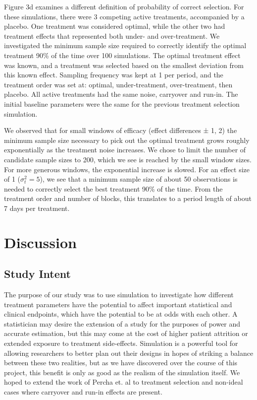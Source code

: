 \documentclass[11pt,]{article}
\begin{document}
Figure 3d examines a different definition of probability of correct
selection. For these simulations, there were 3 competing active
treatments, accompanied by a placebo. One treatment was considered
optimal, while the other two had treatment effects that represented both
under- and over-treatment. We investigated the minimum sample size
required to correctly identify the optimal treatment 90\% of the time
over 100 simulations. The optimal treatment effect was known, and a
treatment was selected based on the smallest deviation from this known
effect. Sampling frequency was kept at 1 per period, and the treatment
order was set at: optimal, under-treatment, over-treatment, then
placebo. All active treatments had the same noise, carryover and run-in.
The initial baseline parameters were the same for the previous treatment
selection simulation.

We observed that for small windows of efficacy (effect differences ± 1,
2) the minimum sample size necessary to pick out the optimal treatment
grows roughly exponentially as the treatment noise increases. We chose
to limit the number of candidate sample sizes to 200, which we see is
reached by the small window sizes. For more generous windows, the
exponential increase is slowed. For an effect size of 1
(\(\sigma_t^2 = 5\)), we see that a minimum sample size of about 50
observations is needed to correctly select the best treatment 90\% of
the time. From the treatment order and number of blocks, this translates
to a period length of about 7 days per treatment.

\section{Discussion}\label{discussion}

\subsection{Study Intent}\label{study-intent}

The purpose of our study was to use simulation to investigate how
different treatment parameters have the potential to affect important
statistical and clinical endpoints, which have the potential to be at
odds with each other. A statistician may desire the extension of a study
for the purposes of power and accurate estimation, but this may come at
the cost of higher patient attrition or extended exposure to treatment
side-effects. Simulation is a powerful tool for allowing researchers to
better plan out their designs in hopes of striking a balance between
these two realities, but as we have discovered over the course of this
project, this benefit is only as good as the realism of the simulation
itself. We hoped to extend the work of Percha et. al to treatment
selection and non-ideal cases where carryover and run-in effects are
present.
\end{document}
